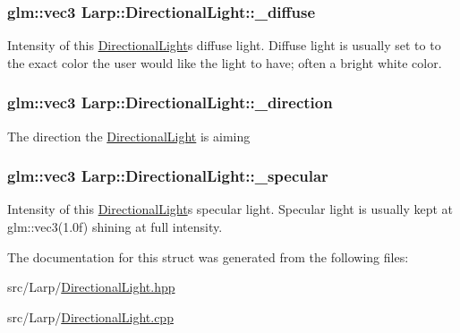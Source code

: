 \subsubsection[{\texorpdfstring{\+\_\+diffuse}{_diffuse}}]{\setlength{\rightskip}{0pt plus 5cm}glm\+::vec3 Larp\+::\+Directional\+Light\+::\+\_\+diffuse}\hypertarget{structLarp_1_1DirectionalLight_a0822553d87f23e62be7c78a4eca62d37}{}\label{structLarp_1_1DirectionalLight_a0822553d87f23e62be7c78a4eca62d37}
Intensity of this \hyperlink{structLarp_1_1DirectionalLight}{Directional\+Light}\textquotesingle{}s diffuse light. Diffuse light is usually set to to the exact color the user would like the light to have; often a bright white color. 
\subsubsection[{\texorpdfstring{\+\_\+direction}{_direction}}]{\setlength{\rightskip}{0pt plus 5cm}glm\+::vec3 Larp\+::\+Directional\+Light\+::\+\_\+direction}\hypertarget{structLarp_1_1DirectionalLight_aabaea01a9ecca611dfe17e6fc43dbb05}{}\label{structLarp_1_1DirectionalLight_aabaea01a9ecca611dfe17e6fc43dbb05}
The direction the \hyperlink{structLarp_1_1DirectionalLight}{Directional\+Light} is aiming 
\subsubsection[{\texorpdfstring{\+\_\+specular}{_specular}}]{\setlength{\rightskip}{0pt plus 5cm}glm\+::vec3 Larp\+::\+Directional\+Light\+::\+\_\+specular}\hypertarget{structLarp_1_1DirectionalLight_aa40445a6b093efd60f43e9c728f7e27f}{}\label{structLarp_1_1DirectionalLight_aa40445a6b093efd60f43e9c728f7e27f}
Intensity of this \hyperlink{structLarp_1_1DirectionalLight}{Directional\+Light}\textquotesingle{}s specular light. Specular light is usually kept at glm\+::vec3(1.\+0f) shining at full intensity. 

The documentation for this struct was generated from the following files\+:\begin{DoxyCompactItemize}
\item 
src/\+Larp/\hyperlink{DirectionalLight_8hpp}{Directional\+Light.\+hpp}\item 
src/\+Larp/\hyperlink{DirectionalLight_8cpp}{Directional\+Light.\+cpp}\end{DoxyCompactItemize}
